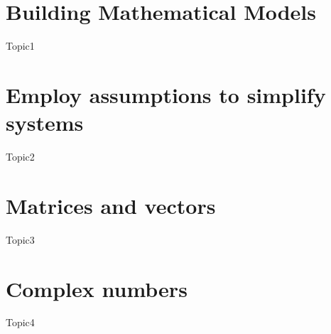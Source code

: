 \documentclass[12pt,a4paper]{article}
\begin{document}
	\tableofcontents
    \section{Building Mathematical Models}
    {Topic1}
    \section{Employ assumptions to simplify systems}
    {Topic2}
    \section{Matrices and vectors}
    {Topic3}
    \section{Complex numbers}
    {Topic4}
\end{document}
